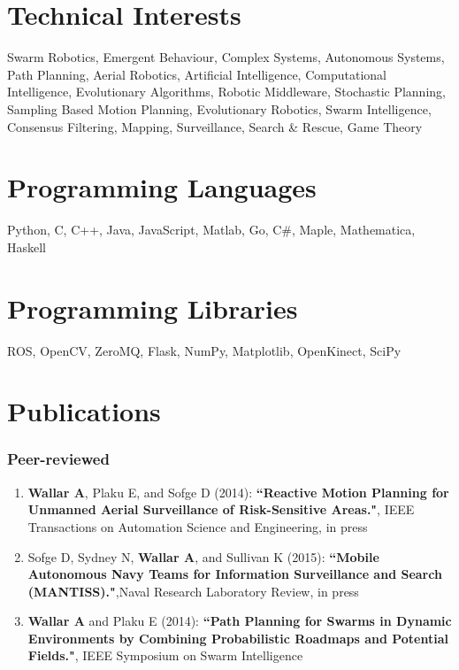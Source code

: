 \documentclass[line,margin]{cv}
\begin{document}
\begin{resume}
\section{Technical Interests}
    Swarm Robotics, Emergent Behaviour, Complex Systems, Autonomous
    Systems, Path Planning, Aerial Robotics, Artificial Intelligence,
    Computational Intelligence, Evolutionary Algorithms, Robotic Middleware,
    Stochastic Planning, Sampling Based Motion Planning, Evolutionary Robotics,
    Swarm Intelligence, Consensus Filtering, Mapping, Surveillance, Search \&
    Rescue, Game Theory

\section{Programming Languages}
    Python, C, C++, Java, JavaScript, Matlab, Go, C\#, Maple,
    Mathematica, Haskell

\section{Programming Libraries}
    ROS, OpenCV, ZeroMQ, Flask, NumPy, Matplotlib, OpenKinect, SciPy

\section{Publications}

\subsubsection{Peer-reviewed}

\begin{enumerate}

    \item \textbf{Wallar A}, Plaku E, and Sofge D (2014):
        \textbf{``Reactive Motion Planning for Unmanned Aerial Surveillance
        of Risk-Sensitive Areas."}, IEEE Transactions on Automation Science
        and Engineering, in press

    \item Sofge D, Sydney N, \textbf{Wallar A}, and Sullivan K (2015):
        \textbf{``Mobile Autonomous Navy Teams for Information Surveillance
        and Search (MANTISS)."},Naval Research Laboratory Review, in press

    \item \textbf{Wallar A} and Plaku E (2014): \textbf{``Path Planning for
        Swarms in Dynamic Environments by Combining Probabilistic Roadmaps
        and Potential Fields."}, IEEE Symposium on Swarm Intelligence


\end{enumerate}
\end{resume}
\end{document}
